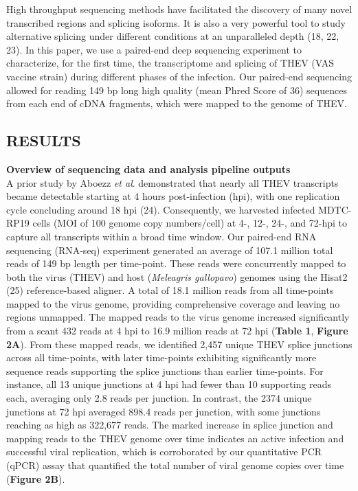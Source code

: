 \documentclass[
]{article}
\begin{document}
High throughput sequencing methods have facilitated the discovery of
many novel transcribed regions and splicing isoforms. It is also a very
powerful tool to study alternative splicing under different conditions
at an unparalleled depth (18, 22, 23). In this paper, we use a
paired-end deep sequencing experiment to characterize, for the first
time, the transcriptome and splicing of THEV (VAS vaccine strain) during
different phases of the infection. Our paired-end sequencing allowed for
reading 149 bp long high quality (mean Phred Score of 36) sequences from
each end of cDNA fragments, which were mapped to the genome of THEV.
\newpage

\subsection{RESULTS}\label{results}

\textbf{Overview of sequencing data and analysis pipeline outputs}\\
A prior study by Aboezz \emph{et al}. demonstrated that nearly all THEV
transcripts became detectable starting at 4 hours post-infection (hpi),
with one replication cycle concluding around 18 hpi (24). Consequently,
we harvested infected MDTC-RP19 cells (MOI of 100 genome copy
numbers/cell) at 4-, 12-, 24-, and 72-hpi to capture all transcripts
within a broad time window. Our paired-end RNA sequencing (RNA-seq)
experiment generated an average of 107.1 million total reads of 149 bp
length per time-point. These reads were concurrently mapped to both the
virus (THEV) and host (\emph{Meleagris gallopavo}) genomes using the
Hisat2 (25) reference-based aligner. A total of 18.1 million reads from
all time-points mapped to the virus genome, providing comprehensive
coverage and leaving no regions unmapped. The mapped reads to the virus
genome increased significantly from a scant 432 reads at 4 hpi to 16.9
million reads at 72 hpi (\textbf{Table 1}, \textbf{Figure 2A}). From
these mapped reads, we identified 2,457 unique THEV splice junctions
across all time-points, with later time-points exhibiting significantly
more sequence reads supporting the splice junctions than earlier
time-points. For instance, all 13 unique junctions at 4 hpi had fewer
than 10 supporting reads each, averaging only 2.8 reads per junction. In
contrast, the 2374 unique junctions at 72 hpi averaged 898.4 reads per
junction, with some junctions reaching as high as 322,677 reads. The
marked increase in splice junction and mapping reads to the THEV genome
over time indicates an active infection and successful viral
replication, which is corroborated by our quantitative PCR (qPCR) assay
that quantified the total number of viral genome copies over time
(\textbf{Figure 2B}).
\end{document}
